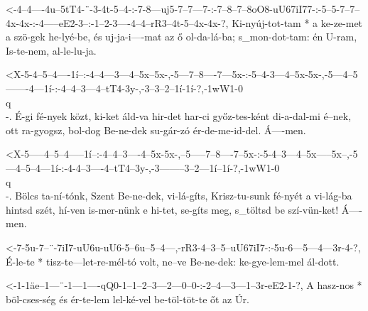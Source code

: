 
  {<-4--4----4u--5tT4-¨-3-4t-5--4-:-7-8---uj5-7--7---7-:-7--8--7--8oO8-uU67iI77-:-5--5-7--7--4x-4x-:-4-----eE2-3--:-1--2-3----4--4--rR3--4t-5--4x-4x-?,}
  {  Ki-nyúj-tot-tam  * a ke-ze-met a szö-gek he-lyé-be, és uj-ja-i----mat        az ő ol-da-lá-ba;  s_mon-dot-tam: én U-ram, Is-te-nem, al-le-lu-ja.}



  {<X-5-4--5--4----1í--:-4--4---3---4--5x--5x-,-5---7--8----7---5x-:-5--4-3---4--5x-5x-,-5---4--5-------4---1í-:-4--4--3---4--tT4-3y-,-3--3--2--1í-1í-?,-1wW1-0\\q\\-.}
  {   É-gi fé-nyek közt, ki-ket áld-va hir-det  har-ci győz-tes-ként di-a-dal-mi é--nek, ott ra-gyogsz, bol-dog  Be-ne-dek su-gár-zó   ér-de-me-id-del.  Á----men.}


  {<X-5-----4--5--4-----1í--:-4--4--3----4--5x-5x-,--5-----7--8----7--5x-:-5-4--3---4--5x-----5x--,-5---4--5--4---1í-:-4-4--3----4--tT4--3y-,-3--------3--2---1í--1í-?,-1wW1-0\\q\\-.}
  {   Bölcs ta-ní-tónk, Szent Be-ne-dek, vi-lá-gíts, Krisz-tu-sunk fé-nyét a vi-lág-ba hintsd szét, hí-ven is-mer-nünk e hi-tet, se-gíts meg, s_töltsd be szí-vün-ket!  Á----men.}

  {<-7-5u-7--¨-7iI7-uU6u-uU6-5--6u--5--4---,-rR3-4--3--5--uU67iI7-:-5u-6---5---4---3r-4-?,}
  {  É-le-te * tisz-te---let-re-mél-tó volt, ne--ve Be-ne-dek:      ke-gye-lem-mel ál-dott.}


  {<-1-1äe--1---¨-1---1----qQ0-1--1--2--3---2---0--0-:-2--4---3---1--3r-eE2-1-?,}
  {  A hasz-nos * böl-cses-ség és ér-te-lem lel-ké-vel be-töl-töt-te őt az  Úr.}


